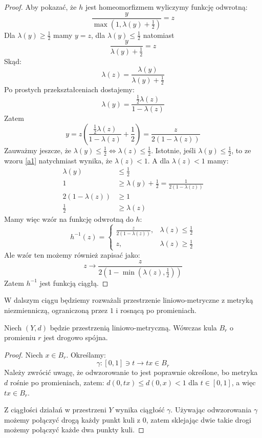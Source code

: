 \begin{lem}
\begin{proof}
    Aby pokazać, że $h$ jest homeomorfizmem wyliczymy funkcję odwrotną:
    \[
      \frac{y}{\max\left(1, \lambda(y) + \frac{1}{2}\right)} = z
    \]
    Dla $\lambda(y) \geq \frac{1}{2}$ mamy $y = z$, dla $\lambda(y) \leq \frac{1}{2}$ natomiast 
    \[
      \frac{y}{\lambda(y) + \frac{1}{2}} = z
    \]
    Skąd:
    \begin{equation}
      \label{a1}
      \lambda(z) = \frac{\lambda(y)}{\lambda(y) + \frac{1}{2}}
    \end{equation}
    Po prostych przekształceniach dostajemy:
    \[
      \lambda(y) = \frac{\frac{1}{2} \lambda(z)}{1 - \lambda(z)}
    \]
    Zatem
    \[
      y = z\left(\frac{\frac{1}{2} \lambda(z)}{1 - \lambda(z)} + \frac{1}{2}\right) = \frac{z}{2(1-\lambda(z))}
    \]
    Zauważmy jeszcze, że $\lambda(y) \leq \frac{1}{2} \iff \lambda(z) \leq \frac{1}{2}$. Istotnie, jeśli $\lambda(y) \leq \frac{1}{2}$, to ze wzoru \eqref{a1} natychmiast wynika, że $\lambda(z) < 1$. A dla $\lambda(z) < 1$ mamy:
    \begin{align*}
      \lambda(y) &\leq \frac{1}{2} \\
      1 &\geq \lambda(y) + \frac{1}{2} = \frac{1}{2(1-\lambda(z))} \\
      2(1-\lambda(z)) &\geq 1 \\
      \frac{1}{2} &\geq \lambda(z)
    \end{align*}
    Mamy więc wzór na funkcję odwrotną do $h$:
    \[
      h^{-1}(z) = 
      \begin{cases}
        \frac{z}{2(1-\lambda(z))},&\lambda(z) \leq \frac{1}{2} \\
        z,&\lambda(z) \geq \frac{1}{2}
      \end{cases}
    \]
    Ale wzór ten możemy również zapisać jako:
    \[
      z \to \frac{z}{2(1-\min(\lambda(z), \frac{1}{2}))}
    \]
    Zatem $h^{-1}$ jest funkcją ciągłą.
  \end{proof}
\end{lem}

W dalszym ciągu będziemy rozważali przestrzenie liniowo-metryczne z metryką niezmienniczą, ograniczoną przez $1$ i rosnącą po promieniach.

\begin{lem}
  Niech $(Y, d)$ będzie przestrzenią liniowo-metryczną. Wówczas kula $B_r$ o promieniu $r$ jest drogowo spójna.
  \begin{proof}
    Niech $x \in B_r$. Określamy:
    \[
      \gamma: [0,1] \ni t \to tx \in B_r
    \]
    Należy zwrócić uwagę, że odwzorowanie to jest poprawnie określone, bo metryka $d$ rośnie po promieniach, zatem: $d(0, tx) \leq d(0, x) < 1$ dla $t \in [0,1]$, a więc $tx \in B_r$.
    
    Z ciągłości działań w przestrzeni $Y$ wynika ciągłość $\gamma$. Używając odwzorowania $\gamma$ możemy połączyć drogą każdy punkt kuli z $0$, zatem sklejając dwie takie drogi możemy połączyć każde dwa punkty kuli.
  \end{proof}
\end{lem}

